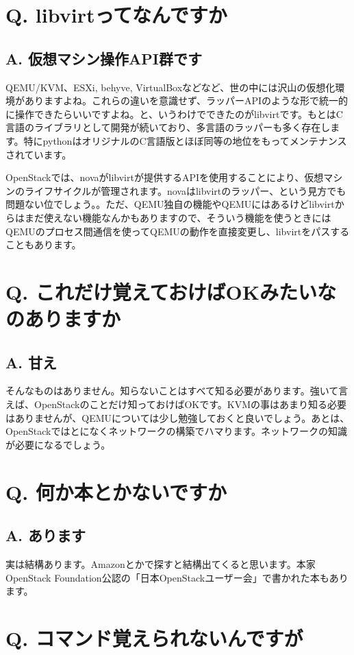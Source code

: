 \documentclass[9pt,b5paper,tombo,openany]{jsbook}
\begin{document}
\section*{Q. libvirtってなんですか}
\subsection*{A. 仮想マシン操作API群です}
QEMU/KVM、ESXi, behyve, VirtualBoxなどなど、世の中には沢山の仮想化環境がありますよね。これらの違いを意識せず、ラッパーAPIのような形で統一的に操作できたらいいですよね。と、いうわけでできたのがlibvirtです。もとはC言語のライブラリとして開発が続いており、多言語のラッパーも多く存在します。特にpythonはオリジナルのC言語版とほぼ同等の地位をもってメンテナンスされています。

OpenStackでは、novaがlibvirtが提供するAPIを使用することにより、仮想マシンのライフサイクルが管理されます。novaはlibvirtのラッパー、という見方でも問題ない位でしょう。。ただ、QEMU独自の機能やQEMUにはあるけどlibvirtからはまだ使えない機能なんかもありますので、そういう機能を使うときにはQEMUのプロセス間通信を使ってQEMUの動作を直接変更し、libvirtをパスすることもあります。

\section*{Q. これだけ覚えておけばOKみたいなのありますか}
\subsection*{A. 甘え}
そんなものはありません。知らないことはすべて知る必要があります。強いて言えば、OpenStackのことだけ知っておけばOKです。KVMの事はあまり知る必要はありませんが、QEMUについては少し勉強しておくと良いでしょう。あとは、OpenStackではとになくネットワークの構築でハマります。ネットワークの知識が必要になるでしょう。

\section*{Q. 何か本とかないですか}
\subsection*{A. あります}
実は結構あります。Amazonとかで探すと結構出てくると思います。本家OpenStack Foundation公認の「日本OpenStackユーザー会」で書かれた本もあります。

\section*{Q. コマンド覚えられないんですが}
\end{document}
